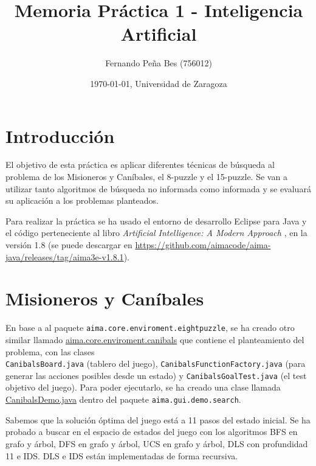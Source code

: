 \documentclass{article}
\author{Fernando Peña Bes (756012)}
\title{Memoria Práctica 1 - Inteligencia Artificial}
\date{\today, Universidad de Zaragoza}
\begin{document}
\maketitle
\section{Introducción} 
El objetivo de esta práctica es aplicar diferentes técnicas de búsqueda al problema de los Misioneros y Caníbales, el 8-puzzle y el 15-puzzle. Se van a utilizar tanto algoritmos de búsqueda no informada como informada y se evaluará su aplicación a los problemas planteados.

Para realizar la práctica se ha usado el entorno de desarrollo Eclipse para Java y el código perteneciente al libro \textit{Artificial Intelligence: A Modern Approach} \cite{AIMA}, en la versión 1.8 (se puede descargar en \url{https://github.com/aimacode/aima-java/releases/tag/aima3e-v1.8.1}).

\section{Misioneros y Caníbales}
En base a al paquete \texttt{aima.core.enviroment.eightpuzzle}, se ha creado otro similar llamado \url{aima.core.enviroment.canibals} que contiene el planteamiento del problema, con las clases\\ \texttt{CanibalsBoard.java} (tablero del juego), \texttt{CanibalsFunctionFactory.java} (para generar las acciones posibles desde un estado) y \texttt{CanibalsGoalTest.java} (el test objetivo del juego). Para poder ejecutarlo, se ha creado una clase llamada \url{CanibalsDemo.java} dentro del paquete \texttt{aima.gui.demo.search}.

Sabemos que la solución óptima del juego está a 11 pasos del estado inicial. Se ha probado a buscar en el espacio de estados del juego con los algoritmos BFS en grafo y árbol, DFS en grafo y árbol, UCS en grafo y árbol, DLS con profundidad 11 e IDS. DLS e IDS están implementadas de forma recursiva.
\end{document}
